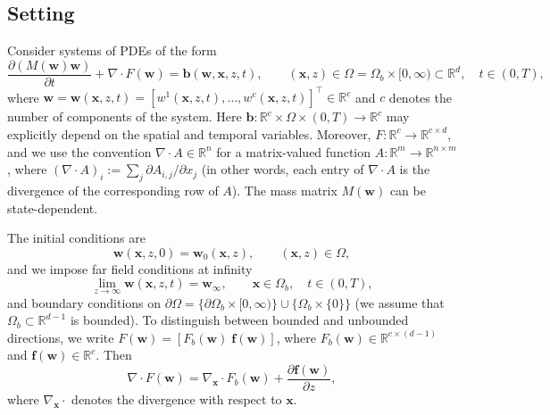 \documentclass[11pt]{article}
\newcommand{\Rbb}{\mathbb{R}}
\newcommand{\bw}{\mathbf{w}}
\newcommand{\wt}{\widetilde{\mathbf{w}}}
\newcommand{\bx}{\mathbf{x}}
\newcommand{\bb}{\mathbf{b}}
\newcommand{\bff}{\mathbf{f}}
\begin{document}
	
	\subsection*{Setting}
	
	Consider systems of PDEs of the form
	\begin{equation}\label{eq:pde}
		\frac{\partial (M(\bw)\bw)}{\partial t} + \nabla\cdot F(\bw) = \bb(\bw,\bx,z,t), \qquad (\bx,z)\in\Omega=\Omega_b\times[0,\infty)\subset\Rbb^d,\quad t\in(0,T),
	\end{equation}
	where $\bw=\bw(\bx,z,t)=[w^1(\bx,z,t),\dots,w^c(\bx,z,t)]^\top\in\Rbb^c$ and $c$ denotes the number of components of the system. Here $\bb:\Rbb^c\times\Omega\times(0,T)\to\Rbb^c$ may explicitly depend on the spatial and temporal variables. Moreover, $F:\Rbb^c\to\Rbb^{c\times d}$, and we use the convention $\nabla\cdot A\in\Rbb^n$ for a matrix-valued function $A:\Rbb^m\to\Rbb^{n\times m}$, where $(\nabla\cdot A)_i:=\sum_j\partial A_{i,j}/\partial x_j$ (in other words, each entry of $\nabla\cdot A$ is the divergence of the corresponding row of $A$). The mass matrix $M(\bw)$ can be state-dependent.
	
	
	The initial conditions are
	\[
	\bw(\bx,z,0)=\bw_0(\bx,z), \qquad (\bx,z)\in\Omega,
	\]
	and we impose far field conditions at infinity
	\[
	\lim_{z\to\infty}\bw(\bx,z,t)=\bw_\infty, \qquad \bx\in\Omega_b,\quad t\in(0,T),
	\]
	and boundary conditions on $\partial\Omega=\{\partial\Omega_b\times[0,\infty)\}\cup\{\Omega_b\times\{0\}\}$ (we assume that $\Omega_b\subset\Rbb^{d-1}$ is bounded). To distinguish between bounded and unbounded directions, we write $F(\bw)=[F_b(\bw)\;\bff(\bw)]$, where $F_b(\bw)\in\Rbb^{c\times(d-1)}$ and $\bff(\bw)\in\Rbb^c$. Then
	\[
	\nabla\cdot F(\bw) = \nabla_\bx\cdot F_b(\bw) + \frac{\partial \bff(\bw)}{\partial z},
	\]
	where $\nabla_\bx\cdot$ denotes the divergence with respect to $\bx$.
	
\end{document}
